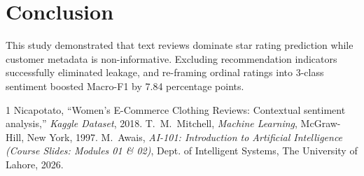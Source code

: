\documentclass[10pt,journal,compsoc,twocolumn]{IEEEtran}
\begin{document}
\section{Conclusion}
This study demonstrated that text reviews dominate star rating prediction while customer metadata is non-informative. Excluding recommendation indicators successfully eliminated leakage, and re-framing ordinal ratings into 3-class sentiment boosted Macro-F1 by 7.84 percentage points.

\begin{thebibliography}{1}
Nicapotato, ``Women's E-Commerce Clothing Reviews: Contextual sentiment analysis,'' \emph{Kaggle Dataset}, 2018.
T.~M.~Mitchell, \emph{Machine Learning}, McGraw-Hill, New York, 1997.
M.~Awais, \emph{AI-101: Introduction to Artificial Intelligence (Course Slides: Modules 01 \& 02)}, Dept. of Intelligent Systems, The University of Lahore, 2026.
\end{thebibliography}
\end{document}
